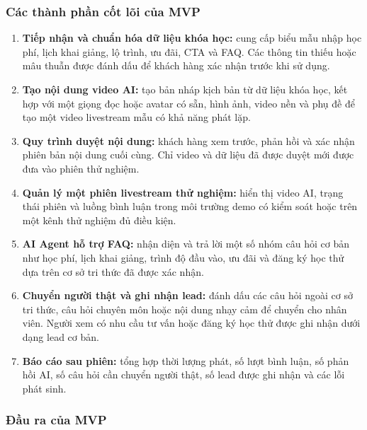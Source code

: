 \subsubsection*{Các thành phần cốt lõi của MVP}

\begin{enumerate}
    \item \textbf{Tiếp nhận và chuẩn hóa dữ liệu khóa học:}
    cung cấp biểu mẫu nhập học phí, lịch khai giảng, lộ trình, ưu đãi, CTA và
    FAQ. Các thông tin thiếu hoặc mâu thuẫn được đánh dấu để khách hàng xác nhận
    trước khi sử dụng.

    \item \textbf{Tạo nội dung video AI:}
    tạo bản nháp kịch bản từ dữ liệu khóa học, kết hợp với một giọng đọc hoặc
    avatar có sẵn, hình ảnh, video nền và phụ đề để tạo một video livestream
    mẫu có khả năng phát lặp.

    \item \textbf{Quy trình duyệt nội dung:}
    khách hàng xem trước, phản hồi và xác nhận phiên bản nội dung cuối cùng.
    Chỉ video và dữ liệu đã được duyệt mới được đưa vào phiên thử nghiệm.

    \item \textbf{Quản lý một phiên livestream thử nghiệm:}
    hiển thị video AI, trạng thái phiên và luồng bình luận trong môi trường demo
    có kiểm soát hoặc trên một kênh thử nghiệm đủ điều kiện.

    \item \textbf{AI Agent hỗ trợ FAQ:}
    nhận diện và trả lời một số nhóm câu hỏi cơ bản như học phí, lịch khai
    giảng, trình độ đầu vào, ưu đãi và đăng ký học thử dựa trên cơ sở tri thức
    đã được xác nhận.

    \item \textbf{Chuyển người thật và ghi nhận lead:}
    đánh dấu các câu hỏi ngoài cơ sở tri thức, câu hỏi chuyên môn hoặc nội dung
    nhạy cảm để chuyển cho nhân viên. Người xem có nhu cầu tư vấn hoặc đăng ký
    học thử được ghi nhận dưới dạng lead cơ bản.

    \item \textbf{Báo cáo sau phiên:}
    tổng hợp thời lượng phát, số lượt bình luận, số phản hồi AI, số câu hỏi cần
    chuyển người thật, số lead được ghi nhận và các lỗi phát sinh.
\end{enumerate}

\subsubsection*{Đầu ra của MVP}

